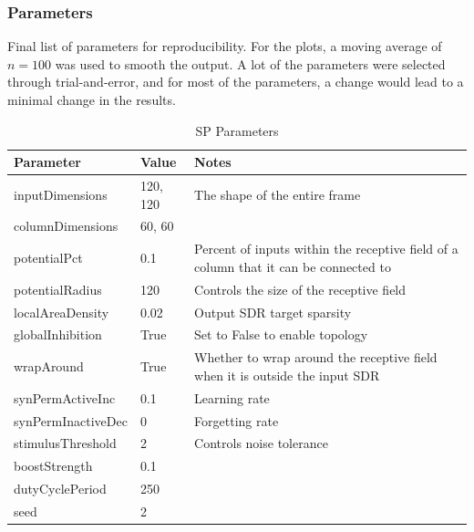 \subsubsection{Parameters}
Final list of parameters for reproducibility. For the plots, a moving average of $n=100$ was used to smooth the output. A lot of the parameters were selected through trial-and-error, and for most of the parameters, a change would lead to a minimal change in the results.
\begin{table}[H]
    \centering
    \begin{tabularx}{\linewidth}{@{}llX@{}}
        \toprule
        \textbf{Parameter} & \textbf{Value} & \textbf{Notes}                                                                       \\
        \midrule
        inputDimensions    & 120, 120       & The shape of the entire frame                                                        \\
        columnDimensions   & 60, 60         &                                                                                      \\
        potentialPct       & 0.1            & Percent of inputs within the receptive field of a column that it can be connected to \\
        potentialRadius    & 120            & Controls the size of the receptive field                                             \\
        localAreaDensity   & 0.02           & Output SDR target sparsity                                                           \\
        globalInhibition   & True           & Set to False to enable topology                                                      \\
        wrapAround         & True           & Whether to wrap around the receptive field when it is outside the input SDR          \\
        synPermActiveInc   & 0.1            & Learning rate                                                                        \\
        synPermInactiveDec & 0              & Forgetting rate                                                                      \\
        stimulusThreshold  & 2              & Controls noise tolerance                                                             \\
        boostStrength      & 0.1            &                                                                                      \\
        dutyCyclePeriod    & 250            &                                                                                      \\
        seed               & 2              &                                                                                      \\
        \bottomrule
    \end{tabularx}

    \caption{SP Parameters}
    \label{tab:bb_sp_params}
\end{table}
